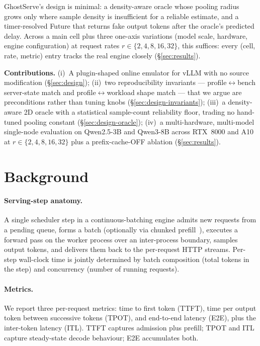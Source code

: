 \documentclass[conference]{IEEEtran}
\newcommand{\sysname}{GhostServe}
\begin{document}
\sysname{}'s design is minimal: a density-aware oracle whose pooling
radius grows only where sample density is insufficient for a reliable
estimate, and a timer-resolved Future that returns fake output tokens
after the oracle's predicted delay. Across a main cell plus
three one-axis variations (model scale, hardware, engine
configuration) at request rates $r\in\{2,4,8,16,32\}$, this
suffices: every (cell, rate, metric) entry tracks the real
engine closely (\S\ref{sec:results}).

\textbf{Contributions.}
(i)~A plugin-shaped online emulator for vLLM with no source
modification (\S\ref{sec:design});
(ii)~two reproducibility invariants --- profile$\leftrightarrow$bench
server-state match and profile$\leftrightarrow$workload shape match
--- that we argue are preconditions rather than tuning knobs
(\S\ref{sec:design-invariants});
(iii)~a density-aware 2D oracle with a statistical sample-count
reliability floor, trading no hand-tuned pooling constant
(\S\ref{sec:design-oracle});
(iv)~a multi-hardware, multi-model single-node evaluation on
Qwen2.5-3B and Qwen3-8B across RTX~8000 and A10 at
$r\in\{2,4,8,16,32\}$ plus a prefix-cache-OFF ablation
(\S\ref{sec:results}).

\section{Background}
\label{sec:background}

\paragraph{Serving-step anatomy.} A single scheduler step in a
continuous-batching engine admits new requests from a pending queue,
forms a batch (optionally via chunked prefill~\cite{agrawal2024sarathi}),
executes a forward pass on the worker process over an inter-process
boundary, samples output tokens, and delivers them back to the
per-request HTTP streams. Per-step wall-clock time is jointly
determined by batch composition (total tokens in the step) and
concurrency (number of running requests).

\paragraph{Metrics.} We report three per-request metrics: time to
first token (TTFT), time per output token between successive tokens
(TPOT), and end-to-end latency (E2E), plus the inter-token latency
(ITL). TTFT captures admission plus prefill; TPOT and ITL capture
steady-state decode behaviour; E2E accumulates both.
\end{document}
